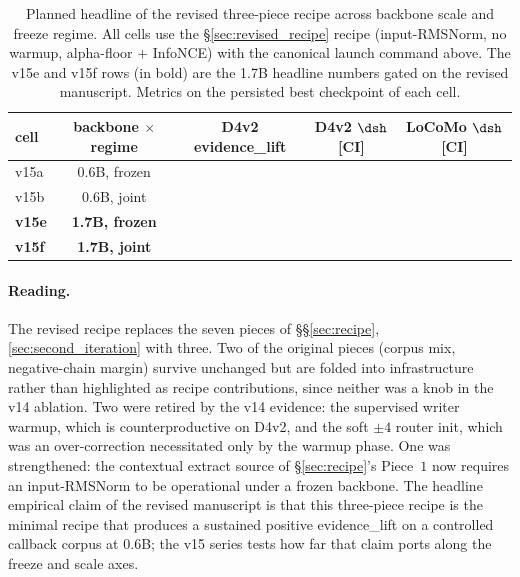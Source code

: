 \begin{table}[t]
\centering
\caption{Planned headline of the revised three-piece recipe across
backbone scale and freeze regime. All cells use the
\S\ref{sec:revised_recipe} recipe (input-RMSNorm, no warmup,
alpha-floor $+$ InfoNCE) with the canonical launch command above.
The v15e and v15f rows (in bold) are the 1.7B headline numbers
gated on the revised manuscript. Metrics on the persisted best
checkpoint of each cell.}
\label{tab:revised_headline}
\small
\begin{tabular}{lcccc}
\toprule
cell & backbone $\times$ regime & D4v2 evidence\_lift & D4v2 $\dsh$ [CI] & LoCoMo $\dsh$ [CI] \\
\midrule
v15a & 0.6B, frozen      & \todo{} & \todo{} & \todo{} \\
v15b & 0.6B, joint       & \todo{} & \todo{} & \todo{} \\
\textbf{v15e} & \textbf{1.7B, frozen} & \todo{} & \todo{} & \todo{} \\
\textbf{v15f} & \textbf{1.7B, joint}  & \todo{} & \todo{} & \todo{} \\
\bottomrule
\end{tabular}
\end{table}

\paragraph{Reading.}
The revised recipe replaces the seven pieces of \S\S\ref{sec:recipe},
\ref{sec:second_iteration} with three. Two of the original pieces
(corpus mix, negative-chain margin) survive unchanged but are
folded into infrastructure rather than highlighted as recipe
contributions, since neither was a knob in the v14 ablation. Two
were retired by the v14 evidence: the supervised writer warmup,
which is counterproductive on D4v2, and the soft $\pm 4$ router
init, which was an over-correction necessitated only by the
warmup phase. One was strengthened: the contextual extract source
of \S\ref{sec:recipe}'s Piece~$1$ now requires an input-RMSNorm to
be operational under a frozen backbone. The headline empirical
claim of the revised manuscript is that this three-piece recipe is
the minimal recipe that produces a sustained positive
evidence\_lift on a controlled callback corpus at $0.6$B; the v15
series tests how far that claim ports along the freeze and scale
axes.
